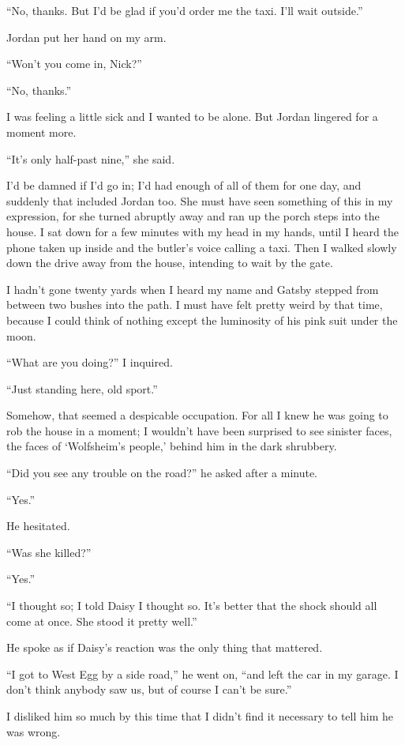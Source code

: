 \documentclass{znotebook}
\begin{document}
``No, thanks. But I’d be glad if you’d order me the taxi. I’ll wait outside.''

Jordan put her hand on my arm.

``Won’t you come in, Nick?''

``No, thanks.''

I was feeling a little sick and I wanted to be alone. But Jordan lingered for a moment more.

``It’s only half-past nine,'' she said.

I’d be damned if I’d go in; I’d had enough of all of them for one day, and suddenly that included Jordan too. She must have seen something of this in my expression, for she turned abruptly away and ran up the porch steps into the house. I sat down for a few minutes with my head in my hands, until I heard the phone taken up inside and the butler’s voice calling a taxi. Then I walked slowly down the drive away from the house, intending to wait by the gate.

I hadn’t gone twenty yards when I heard my name and Gatsby stepped from between two bushes into the path. I must have felt pretty weird by that time, because I could think of nothing except the luminosity of his pink suit under the moon.

``What are you doing?'' I inquired.

``Just standing here, old sport.''

Somehow, that seemed a despicable occupation. For all I knew he was going to rob the house in a moment; I wouldn’t have been surprised to see sinister faces, the faces of ‘Wolfsheim’s people,’ behind him in the dark shrubbery.

``Did you see any trouble on the road?'' he asked after a minute.

``Yes.''

He hesitated.

``Was she killed?''

``Yes.''

``I thought so; I told Daisy I thought so. It’s better that the shock should all come at once. She stood it pretty well.''

He spoke as if Daisy’s reaction was the only thing that mattered.

``I got to West Egg by a side road,'' he went on, ``and left the car in my garage. I don’t think anybody saw us, but of course I can’t be sure.''

I disliked him so much by this time that I didn’t find it necessary to tell him he was wrong.
\end{document}

